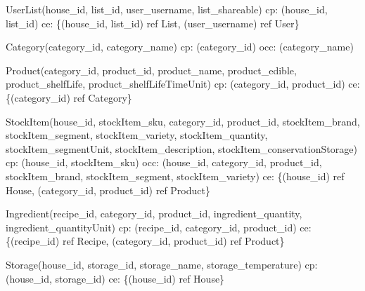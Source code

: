 {\begin{description}
		\item UserList(house\_id, list\_id, user\_username, list\_shareable)
		\newline
		\acrshort{cp}: (house\_id, list\_id) \newline
		\acrshort{ce}: \{(house\_id, list\_id) ref List, (user\_username) ref User\}
		
		\item Category(category\_id, category\_name)
		\newline
		\acrshort{cp}: (category\_id) \newline
		\acrshort{occ}: (category\_name)
		
		\item Product(category\_id, product\_id, product\_name, product\_edible, product\_shelfLife, \newline product\_shelfLifeTimeUnit) \newline
		\acrshort{cp}: (category\_id, product\_id) \newline
		\acrshort{ce}: \{(category\_id) ref Category\}
		
		\item StockItem(house\_id, stockItem\_sku, category\_id, product\_id, stockItem\_brand, stockItem\_segment, stockItem\_variety, stockItem\_quantity, stockItem\_segmentUnit, stockItem\_description, stockItem\_conservationStorage) \newline
		\acrshort{cp}: (house\_id, stockItem\_sku) \newline
		\acrshort{occ}: (house\_id, category\_id, product\_id, stockItem\_brand, stockItem\_segment, \newline stockItem\_variety) \newline
		\acrshort{ce}: \{(house\_id) ref House, (category\_id, product\_id) ref Product\}
		
		\item Ingredient(recipe\_id, category\_id, product\_id, ingredient\_quantity, ingredient\_quantityUnit) \newline
		\acrshort{cp}: (recipe\_id, category\_id, product\_id) \newline
		\acrshort{ce}: \{(recipe\_id) ref Recipe, (category\_id, product\_id) ref Product\}
		
		\item Storage(house\_id, storage\_id, storage\_name, storage\_temperature)  \newline
		\acrshort{cp}:(house\_id, storage\_id) \newline
		\acrshort{ce}: \{(house\_id) ref House\}
	

\end{description}}

